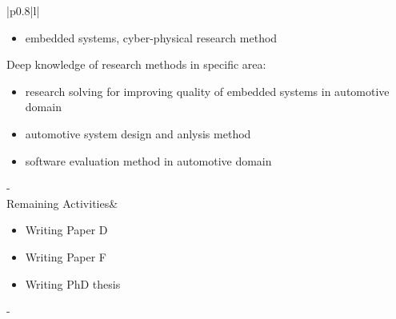 \begin{longtable}{|p{0.8\linewidth}|l|}
\begin{minipage}{\linewidth}
\begin{itemize}
  \item embedded systems, cyber-physical research method
  \end{itemize}
  Deep knowledge of research methods in specific area:
  \begin{itemize} \itemsep-0.25em
  \item research solving for improving quality of embedded systems in automotive domain
  \item automotive system design and anlysis method
  \item software evaluation method in automotive domain
  \end{itemize}
  \end{minipage}\hfill\vline\kern-\arrayrulewidth\\[4cm]
\hline   Remaining Activities&\\
\hline {}
\begin{minipage}{\linewidth}\vspace{0.2cm}
  \begin{itemize} \itemsep-0.25em
  \item Writing Paper D
  \item Writing Paper F
  \item Writing PhD thesis
  \end{itemize}
  \end{minipage}\hfill\vline\kern-\arrayrulewidth\\[2cm]
\hline
\end{longtable}


